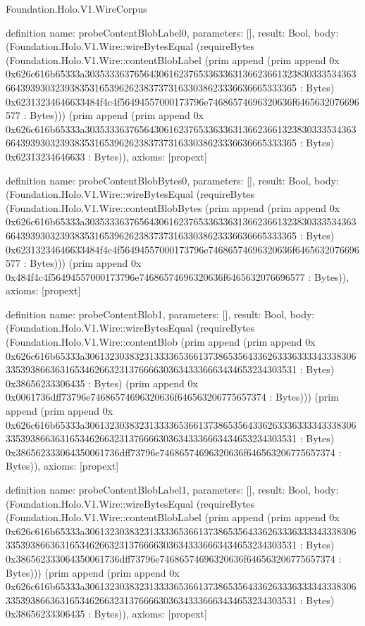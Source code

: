 \begin{lexlean}{Foundation.Holo.V1.WireCorpus}
\begin{semanticmodule}
definition{
  name: probeContentBlobLabel0,
  parameters: [],
  result: Bool,
  body: (Foundation.Holo.V1.Wire::wireBytesEqual (requireBytes (Foundation.Holo.V1.Wire::contentBlobLabel (prim append (prim append 0x 0x626c616b65333a303533363765643061623765336336313662366132383033353436366439393032393835316539626238373731633038623336636665333365 : Bytes) 0x62313234646633484f4c4f56494557000173796e74686574696320636f6465632076696577 : Bytes))) (prim append (prim append 0x 0x626c616b65333a303533363765643061623765336336313662366132383033353436366439393032393835316539626238373731633038623336636665333365 : Bytes) 0x62313234646633 : Bytes)),
  axioms: [propext]
}

definition{
  name: probeContentBlobBytes0,
  parameters: [],
  result: Bool,
  body: (Foundation.Holo.V1.Wire::wireBytesEqual (requireBytes (Foundation.Holo.V1.Wire::contentBlobBytes (prim append (prim append 0x 0x626c616b65333a303533363765643061623765336336313662366132383033353436366439393032393835316539626238373731633038623336636665333365 : Bytes) 0x62313234646633484f4c4f56494557000173796e74686574696320636f6465632076696577 : Bytes))) (prim append 0x 0x484f4c4f56494557000173796e74686574696320636f6465632076696577 : Bytes)),
  axioms: [propext]
}

definition{
  name: probeContentBlob1,
  parameters: [],
  result: Bool,
  body: (Foundation.Holo.V1.Wire::wireBytesEqual (requireBytes (Foundation.Holo.V1.Wire::contentBlob (prim append (prim append 0x 0x626c616b65333a306132303832313333653661373865356433626333633334333830633539386636316534626632313766663036343336663434653234303531 : Bytes) 0x38656233306435 : Bytes) (prim append 0x 0x0061736dff73796e74686574696320636f646563206775657374 : Bytes))) (prim append (prim append 0x 0x626c616b65333a306132303832313333653661373865356433626333633334333830633539386636316534626632313766663036343336663434653234303531 : Bytes) 0x386562333064350061736dff73796e74686574696320636f646563206775657374 : Bytes)),
  axioms: [propext]
}

definition{
  name: probeContentBlobLabel1,
  parameters: [],
  result: Bool,
  body: (Foundation.Holo.V1.Wire::wireBytesEqual (requireBytes (Foundation.Holo.V1.Wire::contentBlobLabel (prim append (prim append 0x 0x626c616b65333a306132303832313333653661373865356433626333633334333830633539386636316534626632313766663036343336663434653234303531 : Bytes) 0x386562333064350061736dff73796e74686574696320636f646563206775657374 : Bytes))) (prim append (prim append 0x 0x626c616b65333a306132303832313333653661373865356433626333633334333830633539386636316534626632313766663036343336663434653234303531 : Bytes) 0x38656233306435 : Bytes)),
  axioms: [propext]
}


\end{semanticmodule}
\end{lexlean}

